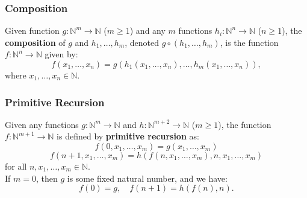 \documentclass{beamer}
\begin{document}
\begin{frame}
  \frametitle{Composition}
  \begin{definition}
    Given function \( g: \mathbb{N}^m \to \mathbb{N} \) (\( m \geq 1 \)) and any \( m \) functions \( h_i: \mathbb{N}^n \to \mathbb{N} \) (\( n \geq 1 \)), the \textbf{composition} of \( g \) and \( h_1, \dots, h_m \), denoted \( g \circ (h_1, \dots, h_m) \), is the function \( f: \mathbb{N}^n \to \mathbb{N} \) given by:
    \[
      f(x_1, \dots, x_n) = g(h_1(x_1, \dots, x_n), \dots, h_m(x_1, \dots, x_n)),
    \]
    where \( x_1, \dots, x_n \in \mathbb{N} \).
  \end{definition}
\end{frame}

\begin{frame}
  \frametitle{Primitive Recursion}

  \begin{definition}
    Given any functions \( g: \mathbb{N}^m \to \mathbb{N} \) and \( h: \mathbb{N}^{m+2} \to \mathbb{N} \) (\( m \geq 1 \)), the function \( f: \mathbb{N}^{m+1} \to \mathbb{N} \) is defined by \textbf{primitive recursion} as:
    \[
      f(0, x_1, \dots, x_m) = g(x_1, \dots, x_m)
    \]
    \[
      f(n+1, x_1, \dots, x_m) = h(f(n, x_1, \dots, x_m), n, x_1, \dots, x_m)
    \]
    for all \( n, x_1, \dots, x_m \in \mathbb{N} \). \\
    If \( m = 0 \), then \( g \) is some fixed natural number, and we have:
    \[
      f(0) = g, \quad f(n+1) = h(f(n), n).
    \]
  \end{definition}

\end{frame}


\end{document}
